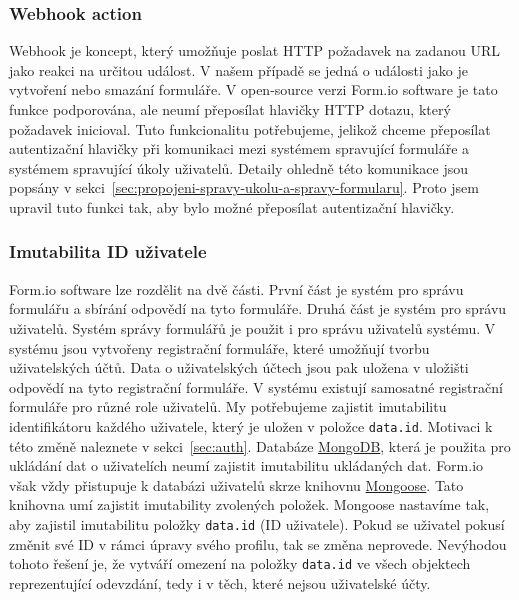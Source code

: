 \subsubsection{Webhook action}\label{subsubsec:webhook-action}

Webhook je koncept, který umožňuje poslat HTTP požadavek na zadanou URL jako reakci na určitou událost.
V našem případě se jedná o události jako je vytvoření nebo smazání formuláře.
V open-source verzi Form.io software je tato funkce podporována, ale neumí přeposílat hlavičky HTTP dotazu, který požadavek inicioval.
Tuto funkcionalitu potřebujeme, jelikož chceme přeposílat autentizační hlavičky při komunikaci mezi systémem spravující formuláře a systémem spravující úkoly uživatelů.
Detaily ohledně této komunikace jsou popsány v sekci~\ref{sec:propojeni-spravy-ukolu-a-spravy-formularu}.
Proto jsem upravil tuto funkci tak, aby bylo možné přeposílat autentizační hlavičky.

\subsubsection{Imutabilita ID uživatele}\label{subsubsec:imutabilita-id-uzivatele}

Form.io software lze rozdělit na dvě části.
První část je systém pro správu formulářu a sbírání odpovědí na tyto formuláře.
Druhá část je systém pro správu uživatelů.
Systém správy formulářů je použit i pro správu uživatelů systému.
V systému jsou vytvořeny registrační formuláře, které umožňují tvorbu uživatelských účtů.
Data o uživatelských účtech jsou pak uložena v uložišti odpovědí na tyto registrační formuláře.
V systému existují samosatné registrační formuláře pro různé role uživatelů.
My potřebujeme zajistit imutabilitu identifikátoru každého uživatele, který je uložen v položce \texttt{data.id}.
Motivaci k této změně naleznete v sekci~\ref{sec:auth}.
Databáze \href{https://www.mongodb.com/}{MongoDB}, která je použita pro ukládání dat o uživatelích neumí zajistit imutabilitu ukládaných dat.
Form.io však vždy přistupuje k databázi uživatelů skrze knihovnu \href{https://mongoosejs.com/}{Mongoose}.
Tato knihovna umí zajistit imutability zvolených položek.
Mongoose nastavíme tak, aby zajistil imutabilitu položky \texttt{data.id} (ID uživatele).
Pokud se uživatel pokusí změnit své ID v rámci úpravy svého profilu, tak se změna neprovede.
Nevýhodou tohoto řešení je, že vytváří omezení na položky \texttt{data.id} ve všech objektech reprezentující odevzdání, tedy i v těch, které nejsou uživatelské účty.

